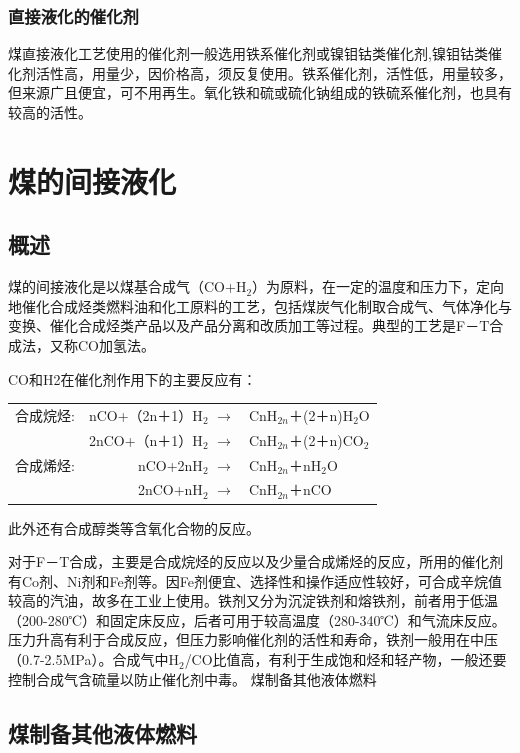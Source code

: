 \documentclass[10pt,openany]{ctexbook}
\begin{document}
\subsubsection{直接液化的催化剂}
煤直接液化工艺使用的催化剂一般选用铁系催化剂或镍钼钴类催化剂,镍钼钴类催化剂活性高，用量少，因价格高，须反复使用。铁系催化剂，活性低，用量较多，但来源广且便宜，可不用再生。氧化铁和硫或硫化钠组成的铁硫系催化剂，也具有较高的活性。
\section{煤的间接液化}
\subsection{概述}
煤的间接液化是以煤基合成气（CO+H$_2$）为原料，在一定的温度和压力下，定向地催化合成烃类燃料油和化工原料的工艺，包括煤炭气化制取合成气、气体净化与变换、催化合成烃类产品以及产品分离和改质加工等过程。典型的工艺是F－T合成法，又称CO加氢法。\par
CO和H2在催化剂作用下的主要反应有：\par
\begin{tabular}{crl}

合成烷烃:& nCO+（2n＋1）H$_2$  $\longrightarrow$& CnH$_{2n}$＋(2＋n)H$_2$O \\

 & 2nCO+（n＋1）H$_2$  $\longrightarrow$ & CnH$_{2n}$＋(2＋n)CO$_2$ \\

合成烯烃:& nCO+2nH$_2$ $\longrightarrow$ & CnH$_{2n}$＋nH$_2$O \\

 & 2nCO+nH$_2$          $\longrightarrow$ & CnH$_{2n}$＋nCO \\

\end{tabular}
此外还有合成醇类等含氧化合物的反应。\par
对于F－T合成，主要是合成烷烃的反应以及少量合成烯烃的反应，所用的催化剂有Co剂、Ni剂和Fe剂等。因Fe剂便宜、选择性和操作适应性较好，可合成辛烷值较高的汽油，故多在工业上使用。铁剂又分为沉淀铁剂和熔铁剂，前者用于低温（200-280℃）和固定床反应，后者可用于较高温度（280-340℃）和气流床反应。压力升高有利于合成反应，但压力影响催化剂的活性和寿命，铁剂一般用在中压（0.7-2.5MPa）。合成气中H$_2$/CO比值高，有利于生成饱和烃和轻产物，一般还要控制合成气含硫量以防止催化剂中毒。
煤制备其他液体燃料
\subsection{煤制备其他液体燃料}
\end{document}
